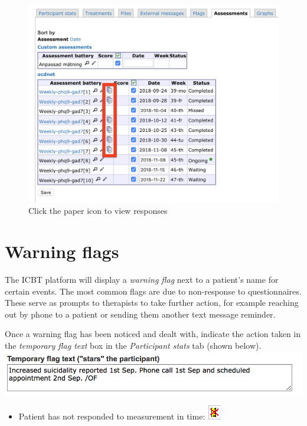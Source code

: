 \documentclass[]{book}
\providecommand{\tightlist}{%
  \setlength{\itemsep}{0pt}\setlength{\parskip}{0pt}}
\begin{document}
\begin{figure}
\centering
\includegraphics{images/assessments-list.png}
\caption{Click the paper icon to view responses}
\end{figure}

\hypertarget{warning-flags}{%
\section{Warning flags}\label{warning-flags}}

The ICBT platform will display a \emph{warning flag} next to a patient's name for certain events. The most common flags are due to non-response to questionnaires. These serve as prompts to therapists to take further action, for example reaching out by phone to a patient or sending them another text message reminder.

Once a warning flag has been noticed and dealt with, indicate the action taken in the \emph{temporary flag text} box in the \emph{Participant stats} tab (shown below).
\includegraphics{images/temporary-flag-text.png}

\begin{itemize}
\tightlist
\item
  Patient has not responded to measurement in time: \includegraphics{images/measurement-delay-flag.png}
\end{itemize}
\end{document}
